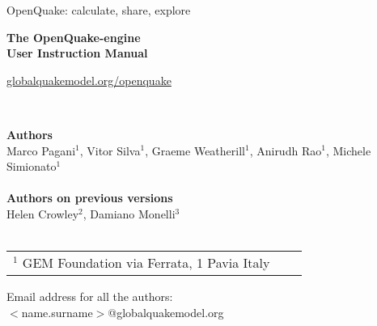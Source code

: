 \documentclass[11pt,fleqn]{book} %
\begin{document}





\begingroup
\thispagestyle{empty}
\begin{center}
\par\normalfont\fontsize{15}{15}\sffamily\selectfont
\textcolor{oqblue}{OpenQuake: calculate, share, explore}
\vspace*{9cm}
\par\bfseries\fontsize{35}{35}\sffamily\selectfont
\textcolor{gembrown}{The OpenQuake-engine\\User Instruction Manual}\par
\vspace*{9cm}
\par\normalfont\fontsize{15}{15}\sffamily\selectfont
\href{http://globalquakemodel.org/openquake/}{\textcolor{oqblue}{globalquakemodel.org/openquake}}
\end{center}
\endgroup


\newpage
~\vfill
\thispagestyle{empty}

\noindent
   \textbf{Authors} \\
   Marco Pagani$^1$, Vitor Silva$^1$, Graeme Weatherill$^1$,
   Anirudh Rao$^1$, Michele Simionato$^1$\hfill \\
   \hfill \\
   \textbf{Authors on previous versions} \\
   Helen Crowley$^2$, Damiano Monelli$^3$\hfill \\
   \hfill \\
   \small
   \begin{tabular}{p{4cm}p{4cm}p{4cm}}
   $^1$ GEM Foundation \hfill \newline
   via Ferrata, 1 \hfill \newline
   20133 Pavia \hfill \newline
   Italy \hfill \newline
   \end{tabular} \hfill \newline
   Email address for all the authors:\hfill\\
   $<$name.surname$>$@globalquakemodel.org\hfill\\
   \normalsize
\end{document}
